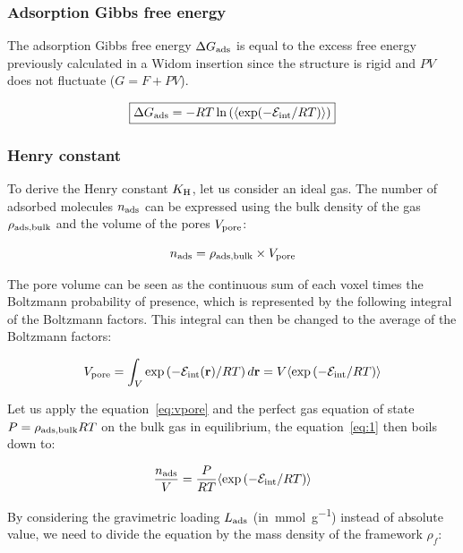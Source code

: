 \documentclass[main.tex]{subfiles}
\begin{document}
\subsubsection{Adsorption Gibbs free energy}

The adsorption Gibbs free energy $\Delta G_{\text{ads}}$ is equal to the excess free energy previously calculated in a Widom insertion since the structure is rigid and $PV$ does not fluctuate ($G = F + PV$). 

\begin{equation}\label{eq:ads_gibbs}
  \boxed{
  \Delta G_{\text{ads}} = -RT \ln\left(\langle \exp(-\mathcal{E}_{\text{int}}/RT) \rangle\right)
  }
\end{equation}

\subsubsection{Henry constant}

To derive the Henry constant $K_{\text{H}}$, let us consider an ideal gas. The number of adsorbed molecules $n_{\text{ads}}$ can be expressed using the bulk density of the gas $\rho_{\text{ads,bulk}}$ and the volume of the pores $V_{\text{pore}}$:

\begin{equation}\label{eq:1}
    n_{\text{ads}} = \rho_{\text{ads,bulk}} \times V_{\text{pore}}  
\end{equation}

The pore volume can be seen as the continuous sum of each voxel times the Boltzmann probability of presence, which is represented by the following integral of the Boltzmann factors. This integral can then be changed to the average of the Boltzmann factors:

\begin{equation}\label{eq:vpore}
    V_{\text{pore}} = \int_V \exp\left(- \mathcal{E}_{\text{int}}(\textbf{r})/RT\right) d\textbf{r} = V \langle \exp\left(-\mathcal{E}_{\text{int}}/RT\right) \rangle
\end{equation}

Let us apply the equation~\ref{eq:vpore} and the perfect gas equation of state $P = \rho_{\text{ads,bulk}}RT$ on the bulk gas in equilibrium, the equation~\ref{eq:1} then boils down to:

\begin{equation}
    \dfrac{n_{\text{ads}}}{V} = \dfrac{P}{RT} \langle \exp\left(-\mathcal{E}_{\text{int}}/RT\right) \rangle
\end{equation}

By considering the gravimetric loading $L_{\text{ads}}$ (in~\si{\milli\mole\per\gram}) instead of absolute value, we need to divide the equation by the mass density of the framework $\rho_f$:
\end{document}
